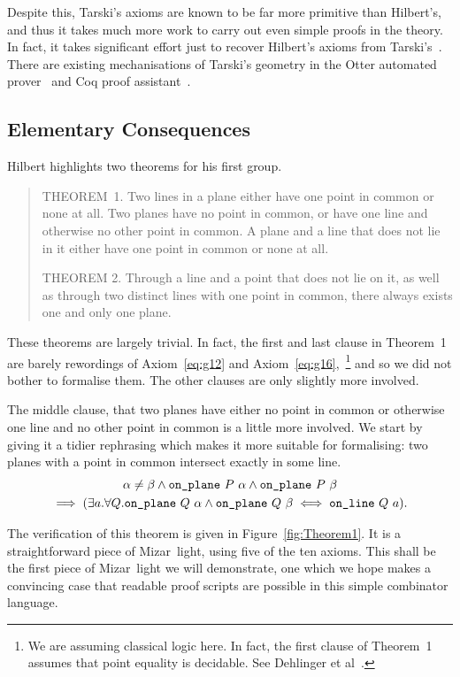 Despite this, Tarski's axioms are known to be far more primitive than Hilbert's, and thus it takes much more work to carry out even simple proofs in the theory. In fact, it takes significant effort just to recover Hilbert's axioms from Tarski's~\cite{NarbouxTarskiHilbert}. There are existing mechanisations of Tarski's geometry in the Otter automated prover~\cite{QuaifeTarski} and Coq proof assistant~\cite{NarbouxTarski}. 

\subsection{Elementary Consequences}
Hilbert highlights two theorems for his first group.

\begin{quotation}
  THEOREM~1. Two lines in a plane either have one point in common or none at all. Two planes have no point in common, or have one line and otherwise no other point in common. A plane and a line that does not lie in it either have one point in common or none at all.

  THEOREM 2. Through a line and a point that does not lie on it, as well as through two distinct lines with one point in common, there always exists one and only one plane.
\end{quotation}

These theorems are largely trivial. In fact, the first and last clause in Theorem~1 are barely rewordings of Axiom~\ref{eq:g12} and Axiom~\ref{eq:g16},~\footnote{We are assuming classical logic here. In fact, the first clause of Theorem~1 assumes that point equality is decidable. See Dehlinger et al~\cite{DehlingerFOG}.} and so we did not bother to formalise them. The other clauses are only slightly more involved. 

The middle clause, that two planes have either no point in common or otherwise one line and no other point in common is a little more involved. We start by giving it a tidier rephrasing which makes it more suitable for formalising: two planes with a point in common intersect exactly in some line.
\begin{multline}
  \alpha \neq \beta \wedge \texttt{on\_plane}\ P\ \alpha \wedge \texttt{on\_plane}\ P\ \beta\\
  \implies (\exists a. \forall Q. \texttt{on\_plane}\ Q\ \alpha \wedge \texttt{on\_plane}\ Q\ \beta \iff \texttt{on\_line}\ Q\ a).
\end{multline}

The verification of this theorem is given in Figure~\ref{fig:Theorem1}. It is a straightforward piece of Mizar~light, using five of the ten axioms. This shall be the first piece of Mizar~light we will demonstrate, one which we hope makes a convincing case that readable proof scripts are possible in this simple combinator language.

